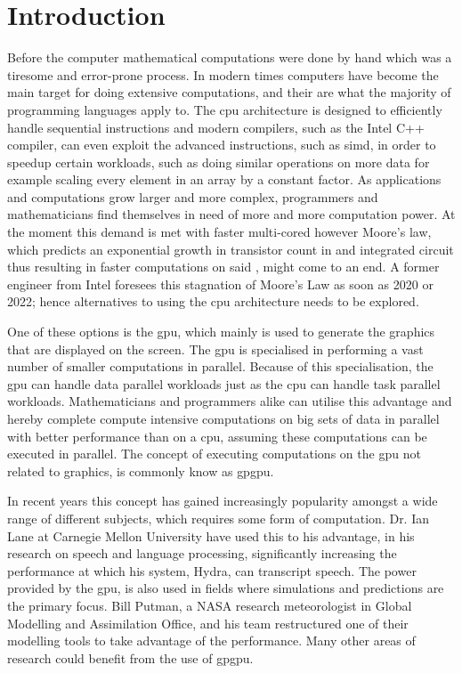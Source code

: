 \chapter{Introduction} %
\label{cha:introduction}
Before the computer mathematical computations were done by hand which was a tiresome and error-prone process.
In modern times computers have become the main target for doing extensive computations, and their  are what the majority of programming languages apply to.
The \acrshort{cpu} architecture is designed to efficiently handle sequential instructions and modern compilers, such as the Intel C++ compiler, can even exploit the   advanced instructions, such as \acrfull{simd}, in order to speedup certain workloads, such as doing similar operations on more data for example scaling every element in an array by a constant factor. \citep{INTEL_SIMD}
As applications and computations grow larger and more complex, programmers and mathematicians find themselves in need of more and more computation power. \citep[pp. 4]{OpenCL_AMD}
At the moment this demand is met with faster multi-cored   however Moore's law, which predicts an exponential growth in transistor count in and integrated circuit thus resulting in faster computations on said  , might come to an end.
A former engineer from Intel foresees this stagnation of Moore's Law as soon as 2020 or 2022; hence alternatives to using the \acrshort{cpu} architecture needs to be explored. \citep{Moore2013}

One of these options is the \acrfull{gpu}, which mainly is used to generate the graphics that are displayed on the screen.
The \acrshort{gpu} is specialised in performing a vast number of smaller computations in parallel.
Because of this specialisation, the \acrshort{gpu} can handle data parallel workloads just as the \acrshort{cpu} can handle task parallel workloads.
Mathematicians and programmers alike can utilise this advantage and hereby complete compute intensive computations on big sets of data in parallel with better performance than on a \acrshort{cpu}, assuming these computations can be executed in parallel.
The concept of executing computations on the \acrshort{gpu} not related to graphics, is commonly know as \acrfull{gpgpu}.

In recent years this concept has gained increasingly popularity amongst a wide range of different subjects, which requires some form of computation.
Dr. Ian Lane at Carnegie Mellon University have used this to his advantage, in his research on speech and language processing, significantly increasing the performance at which his system, Hydra, can transcript speech. \citep{NvidiaSpotlightIan}
The power provided by the \acrshort{gpu}, is also used in fields where simulations and predictions are the primary focus. 
Bill Putman, a NASA research meteorologist in Global Modelling and Assimilation Office, and his team restructured one of their modelling tools to take advantage of the  performance. \citep{NvidiaSpotlightNasa}
Many other areas of research could benefit from the use of \acrshort{gpgpu}.

